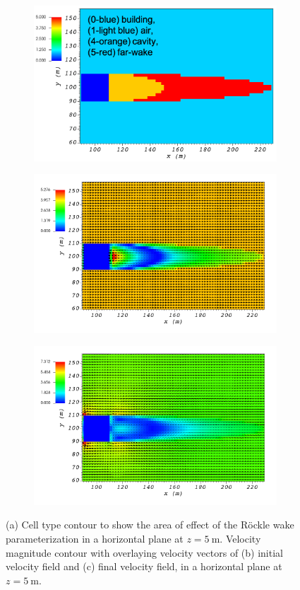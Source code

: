 \begin{figure}[H]
    \centering
    \begin{subfigure}{\textwidth}
    \centering
    \includegraphics[width=10.3cm,keepaspectratio]{Images/wake_z_5_1_init_icell.png}
    \caption{}
    \end{subfigure}
    \begin{subfigure}{\textwidth}
    \centering
    \includegraphics[width=11.0cm,keepaspectratio]{Images/wake_z_5_1_init_vel.png}
    \caption{}
    \end{subfigure}
    \begin{subfigure}{\textwidth}
    \centering
    \includegraphics[width=11.0cm,keepaspectratio]{Images/wake_z_5_1_final.png}
    \caption{}
    \end{subfigure}
    \caption{(a) Cell type contour to show the area of effect of the R\"{o}ckle wake parameterization in a horizontal plane at $z=5\ \si{\meter}$. Velocity magnitude contour with overlaying velocity vectors of (b) initial velocity field and (c) final velocity field, in a horizontal plane at $z=5\ \si{\meter}$.}
\end{figure}

